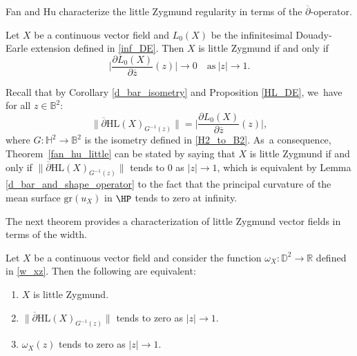 Fan and Hu characterize the little Zygmund regularity in terms of the $\overline{\partial}$-operator.
\begin{theorem}\label{fan_hu_little}
Let $X$ be a continuous vector field and $L_0(X)$ be the infinitesimal Douady-Earle extension defined in \eqref{inf_DE}. Then $X$ is little Zygmund if and only if\vspace*{-3pt}
\[
\biggl|\frac{\partial L_0(X)}{\partial \overline{z}}(z)\biggr| \to 0 \quad \text{as}\ \lvert z\rvert\to 1.
\]
\end{theorem}
\begin{remark}\label{remark_little_zygmund}
Recall that by Corollary \ref{d_bar_isometry} and Proposition \ref{HL_DE}, we~have for all \(z \in \mathbb{B}^2\):\vspace*{-3pt}
\begin{equation}
\lVert \overline{\partial} \mathrm{HL}(X)_{G^{-1}(z)} \rVert = \biggl| \frac{\partial L_0(X)}{\partial \overline{z}}(z) \biggr|,
\end{equation}
where \(G: \mathbb{H}^2 \to \mathbb{B}^2\) is the isometry defined in \eqref{H2_to_B2}. As~a consequence, Theorem~\ref{fan_hu_little} can be stated by saying that \(X\) is little Zygmund if and only if
\(\lVert \overline{\partial} \mathrm{HL}(X)_{G^{-1}(z)} \rVert\) tends to $0$ as \(\lvert z \rvert \to 1\), which is equivalent by Lemma \ref{d_bar_and_shape_operator} to the fact that the principal curvature of the mean surface \(\mathrm{gr}(u_X)\) in \(\HP\) tends to zero at infinity.
\end{remark}

The next theorem provides a characterization of little Zygmund vector fields in terms of the width.

\begin{theorem}\label{LZVF}
\label{width_goes_to_0}
Let $X$ be a continuous vector field and consider the function $\omega_{X}:\mathbb{D}^2\to \mathbb{R}$ defined in \eqref{w_xz}. Then the following are equivalent:
\begin{enumerate}
\item\label{LZVF1} $X$ is little Zygmund.
\item\label{LZVF2} $\lVert \overline{\partial}\mathrm{HL}(X)_{G^{-1}(z)}\rVert$ tends to zero as $\lvert z\rvert\to 1$.
\item\label{LZVF3} $\omega_X(z)$ tends to zero as $\lvert z\rvert\to 1$.
\end{enumerate}
\end{theorem}

